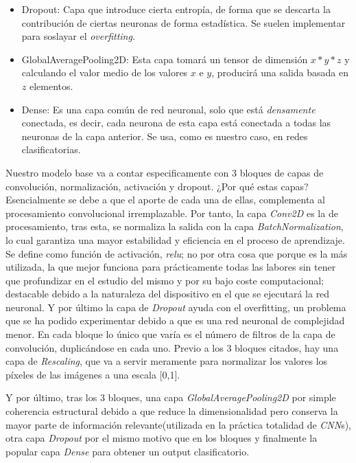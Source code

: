 {\begin{itemize}
    activación son las que arbitran la activación de las neuronas de la red neuronal
    y por ello, repercute en su salida. Existen diversas
    funciones de activación, como lo son \textit{rectified linear unit(relu)},
    \textit{sigmoid}, \textit{softmax}(función de distribución de probabilidad), etc.
    \item Dropout\textsuperscript{\cite{dropout}}: Capa que introduce cierta entropía, de forma que se descarta
    la contribución de ciertas neuronas de forma estadística. Se suelen implementar
    para soslayar el \textit{overfitting}.
    \item GlobalAveragePooling2D\textsuperscript{\cite{gap2d}}: Esta capa tomará un
    tensor de dimensión $x*y*z$ y
    calculando el valor medio de los valores $x$ e $y$, producirá una salida basada en
    $z$ elementos.
    \item Dense\textsuperscript{\cite{dense}}: Es una capa común de red neuronal,
    solo que está \textit{densamente}
    conectada, es decir, cada neurona de esta capa está conectada a todas las neuronas
    de la capa anterior. Se usa, como es nuestro caso, en redes clasificatorias.
\end{itemize}

Nuestro modelo base va a contar especificamente con 3 bloques de capas de convolución,
normalización, activación y dropout.\newline
¿Por qué estas capas? Esencialmente se debe a que el aporte de cada una de ellas,
complementa al procesamiento convolucional irremplazable. Por tanto, la capa
\textit{Conv2D} es la de procesamiento, tras esta, se normaliza la salida con la capa
\textit{BatchNormalization}, lo cual garantiza una mayor estabilidad y eficiencia
en el proceso de aprendizaje. Se define como función de activación, \textit{relu}; no
por otra cosa que porque es la más utilizada, la que mejor funciona para prácticamente
todas las labores sin tener que profundizar en el estudio del mismo y por su bajo
coste computacional; destacable debido a la naturaleza del dispositivo en el que
se ejecutará la red neuronal. Y por último la capa de \textit{Dropout} ayuda
con el overfitting, un problema que se ha podido experimentar debido a que es una red
neuronal de complejidad menor.\newline
En cada bloque lo único que varía es el número de filtros de la capa de convolución,
duplicándose en cada uno.
Previo a los 3 bloques citados, hay una capa de \textit{Rescaling}, que va a servir
meramente para normalizar los valores los píxeles de las imágenes a una escala [0,1].

Y por último, tras los 3 bloques, una capa \textit{GlobalAveragePooling2D} por simple
coherencia estructural debido a que reduce la dimensionalidad pero conserva la mayor
parte de información relevante(utilizada en la práctica totalidad de \textit{CNN}s), otra capa \textit{Dropout} por el mismo motivo que en los
bloques y finalmente la popular capa \textit{Dense} para obtener un output clasificatorio.
}


